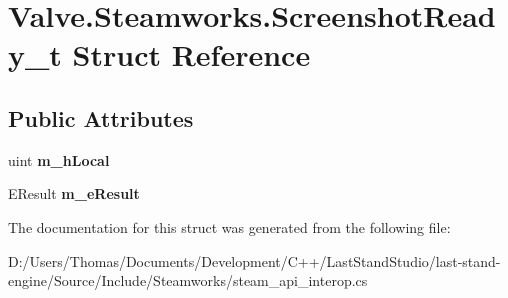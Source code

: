 \hypertarget{structValve_1_1Steamworks_1_1ScreenshotReady__t}{}\section{Valve.\+Steamworks.\+Screenshot\+Ready\+\_\+t Struct Reference}
\label{structValve_1_1Steamworks_1_1ScreenshotReady__t}
\subsection*{Public Attributes}
\begin{DoxyCompactItemize}
\item 
\hypertarget{structValve_1_1Steamworks_1_1ScreenshotReady__t_a670119807c19cb0f77c49e528b7a6b8b}{}uint {\bfseries m\+\_\+h\+Local}\label{structValve_1_1Steamworks_1_1ScreenshotReady__t_a670119807c19cb0f77c49e528b7a6b8b}

\item 
\hypertarget{structValve_1_1Steamworks_1_1ScreenshotReady__t_a86ee99da9a681f2072b515bd138a8f84}{}E\+Result {\bfseries m\+\_\+e\+Result}\label{structValve_1_1Steamworks_1_1ScreenshotReady__t_a86ee99da9a681f2072b515bd138a8f84}

\end{DoxyCompactItemize}


The documentation for this struct was generated from the following file\+:\begin{DoxyCompactItemize}
\item 
D\+:/\+Users/\+Thomas/\+Documents/\+Development/\+C++/\+Last\+Stand\+Studio/last-\/stand-\/engine/\+Source/\+Include/\+Steamworks/steam\+\_\+api\+\_\+interop.\+cs\end{DoxyCompactItemize}
